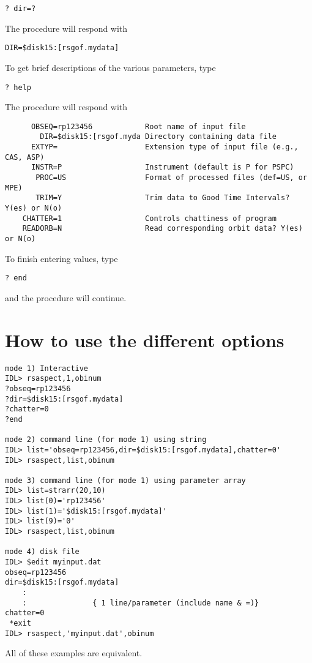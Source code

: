 \medskip\noindent
\begin{verbatim}
? dir=?
\end{verbatim}
The procedure will respond with

\medskip\noindent
\begin{verbatim}
DIR=$disk15:[rsgof.mydata]
\end{verbatim}
To get brief descriptions of the various parameters, type

\medskip\noindent
\begin{verbatim}
? help
\end{verbatim}
The procedure will respond with

\medskip\noindent
\begin{verbatim}
      OBSEQ=rp123456            Root name of input file
        DIR=$disk15:[rsgof.myda Directory containing data file
      EXTYP=                    Extension type of input file (e.g., CAS, ASP)
      INSTR=P                   Instrument (default is P for PSPC)
       PROC=US                  Format of processed files (def=US, or MPE)
       TRIM=Y                   Trim data to Good Time Intervals? Y(es) or N(o)
    CHATTER=1                   Controls chattiness of program
    READORB=N                   Read corresponding orbit data? Y(es) or N(o)
\end{verbatim}
To finish entering values, type

\medskip\noindent
\begin{verbatim}
? end
\end{verbatim}
and the procedure will continue.
 

\section{How to use the different options}

\medskip\noindent
\begin{verbatim}
mode 1) Interactive
IDL> rsaspect,1,obinum
?obseq=rp123456
?dir=$disk15:[rsgof.mydata]
?chatter=0
?end
 
mode 2) command line (for mode 1) using string
IDL> list='obseq=rp123456,dir=$disk15:[rsgof.mydata],chatter=0'
IDL> rsaspect,list,obinum
 
mode 3) command line (for mode 1) using parameter array
IDL> list=strarr(20,10)
IDL> list(0)='rp123456'
IDL> list(1)='$disk15:[rsgof.mydata]'
IDL> list(9)='0'
IDL> rsaspect,list,obinum
 
mode 4) disk file
IDL> $edit myinput.dat
obseq=rp123456
dir=$disk15:[rsgof.mydata]
	:
	:               { 1 line/parameter (include name & =)}
chatter=0
 *exit
IDL> rsaspect,'myinput.dat',obinum
\end{verbatim}
All of these examples are equivalent.
 

